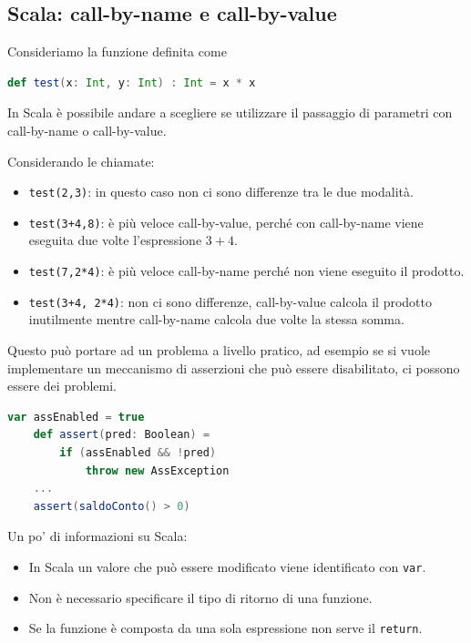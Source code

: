 \subsection{Scala: call-by-name e call-by-value}

Consideriamo la funzione definita come

\begin{lstlisting}[language=Scala]
	def test(x: Int, y: Int) : Int = x * x
\end{lstlisting}

In Scala è possibile andare a scegliere se utilizzare il passaggio di parametri con call-by-name o call-by-value.

Considerando le chiamate:

\begin{itemize}
	\item \texttt{test(2,3)}: in questo caso non ci sono differenze tra le due modalità.
	\item \texttt{test(3+4,8)}: è più veloce call-by-value, perché con call-by-name viene eseguita due volte l'espressione $3+4$.
	\item \texttt{test(7,2*4)}: è più veloce call-by-name perché non viene eseguito il prodotto.
	\item \texttt{test(3+4, 2*4)}: non ci sono differenze, call-by-value calcola il prodotto inutilmente mentre call-by-name calcola due volte la stessa somma.
\end{itemize}

Questo può portare ad un problema a livello pratico, ad esempio se si vuole implementare un meccanismo di asserzioni che può essere disabilitato, ci possono essere dei problemi.

\begin{lstlisting}[language=Scala]
	var assEnabled = true
	def assert(pred: Boolean) = 
		if (assEnabled && !pred)
			throw new AssException
	...
	assert(saldoConto() > 0)
\end{lstlisting}

Un po' di informazioni su Scala:
\begin{itemize}
	\item In Scala un valore che può essere modificato viene identificato con \texttt{var}.
	\item Non è necessario specificare il tipo di ritorno di una funzione.
	\item Se la funzione è composta da una sola espressione non serve il \texttt{return}.
\end{itemize}

